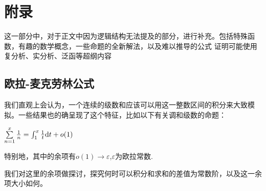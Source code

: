 \documentclass[12pt, a4paper, oneside, UTF8]{ctexbook}
\begin{document}
	\else
	\fi
	\chapter{附录}
	这一部分中，对于正文中因为逻辑结构无法提及的部分，进行补充。包括特殊函数，有趣的数学概念，一些命题的全新解法，以及难以推导的公式
	证明可能使用复分析、实分析、泛函等超纲内容
	\section{欧拉-麦克劳林公式}
		我们直观上会认为，一个连续的级数和应该可以用这一整数区间的积分来大致模拟。一些结果也的确呈现了这个特征，比如以下有关调和级数的命题：
		
		$\sum\limits_{n=1}^{x} \frac{1}{n} = \int_{1}^{x} \frac{1}{t}\mathrm{d} t +o(1)$
		
		特别地，其中的余项有$o(1)\to\varepsilon$,$\varepsilon$为欧拉常数.
		
		我们对这里的余项做探讨，探究何时可以积分和求和的差值为常数阶，以及这一余项大小如何。
\end{document}
